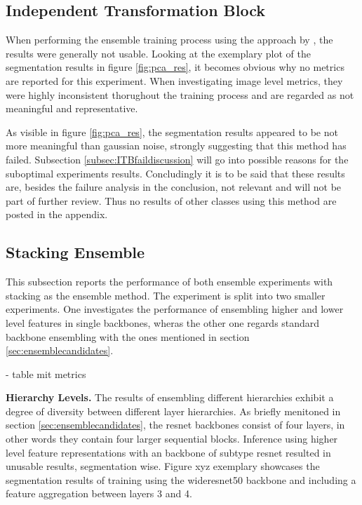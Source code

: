 \subsection{Independent Transformation Block}
\label{subsec:ITBfail}

When performing the ensemble training process using the approach by \cite{EnsembleHeller2023}, the results were generally not usable. Looking at the exemplary plot of the segmentation 
results in figure \ref{fig:pca_res}, it becomes obvious why no metrics are reported for this experiment. When investigating image level metrics, they were highly inconsistent thorughout 
the training process and are regarded as not meaningful and representative.



As visible in figure \ref{fig:pca_res}, the segmentation results appeared to be not more meaningful than gaussian noise, strongly suggesting that this method has failed. Subsection 
\ref{subsec:ITBfaildiscussion} will go into possible reasons for the suboptimal experiments results. Concludingly it is to be said that these results are, besides the failure analysis 
in the conclusion, not relevant and will not be part of further review. Thus no results of other classes using this method are posted in the appendix.

\subsection{Stacking Ensemble}
\label{subsec:stacking}
This subsection reports the performance of both ensemble experiments with stacking as the ensemble method. 
The experiment is split into two smaller experiments. One investigates the performance of ensembling higher and lower level features in 
single backbones, wheras the other one regards standard backbone ensembling with the ones mentioned in section \ref{sec:ensemblecandidates}. 

- table mit metrics


\textbf{Hierarchy Levels.} The results of ensembling different hierarchies exhibit a degree of diversity between different layer hierarchies. As briefly menitoned in section \ref{sec:ensemblecandidates}, the resnet backbones consist of four 
layers, in other words they contain four larger sequential blocks. Inference using higher level feature representations with an backbone of subtype resnet resulted in unusable results, segmentation wise. 
Figure xyz exemplary showcases the segmentation results of training using the wideresnet50 backbone and including a feature aggregation between layers 3 and 4. 

